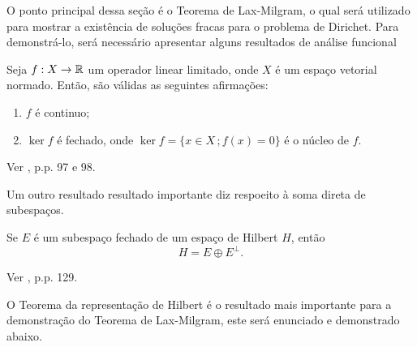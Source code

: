 O ponto principal dessa seção é o Teorema de Lax-Milgram, o qual será utilizado para mostrar a existência de soluções fracas para o problema de Dirichet.
Para demonstrá-lo, será necessário apresentar alguns resultados de análise funcional
\begin{tbox} \label{thm:hilbert1}
    Seja $f : X \to \mathbb{R}$ um operador linear limitado, onde $X$ é um espaço vetorial normado. Então, são válidas as seguintes afirmações:
    \begin{enumerate}[leftmargin=*, label=\textbf{(\alph*)}]
        \item $f$ é continuo;
        \item $\ker f$ é fechado, onde $\ker f = \{x \in X \,; f(x) = 0\}$ é o núcleo de $f$.
    \end{enumerate}
\end{tbox}
\begin{prf}
    Ver \cite{kreyszig-functional.analysis}, p.p. 97 e 98.
\end{prf}

Um outro resultado resultado importante diz respoeito à soma direta de subespaços.

\begin{tbox} \label{thm:hilbert2}
    Se $E$ é um subespaço fechado de um espaço de Hilbert $H$, então
    \[
        H = E \oplus E^\perp.
    \]
\end{tbox}
\begin{prf}
    Ver \cite{cesar-analise.funcional}, p.p. 129.
\end{prf}

O Teorema da representação de Hilbert é o resultado mais importante para a demonstração do Teorema de Lax-Milgram, este será enunciado e demonstrado abaixo.

